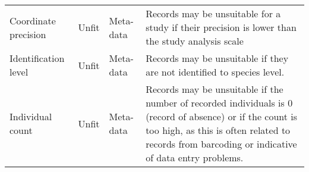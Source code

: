 \documentclass[fleqn,10pt,lineno]{wlpeerj} %
\begin{document}
\begin{table}[!h]
\begin{tabular}[t]{>{\raggedright\arraybackslash}p{2cm}>{\raggedright\arraybackslash}p{1cm}>{\raggedright\arraybackslash}p{2.5cm}>{\raggedright\arraybackslash}p{9cm}}
\addlinespace
\rowcolor{gray!6}  Coordinate precision & Unfit & Meta-data & Records may be unsuitable for a study if their precision is lower than the study analysis scale\\
Identification level & Unfit & Meta-data & Records may be unsuitable if they are not identified to species level.\\
\rowcolor{gray!6}  Individual count & Unfit & Meta-data & Records may be unsuitable if the number of recorded individuals is 0 (record of absence) or if the count is too high, as this is often related to records from barcoding or indicative of data entry problems.\\
\bottomrule
\end{tabular}
\end{table}

\begin{landscape}\begin{table}


\end{table}
\end{landscape}
\end{document}
